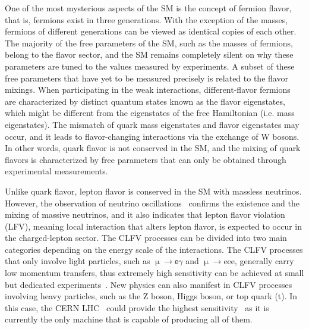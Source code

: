 One of the most mysterious aspects of the \ac{SM} is the concept of fermion flavor, that is, fermions exist in three generations. With the exception of the masses, fermions of different generations can be viewed as identical copies of each other. The majority of the free parameters of the \ac{SM}, such as the masses of fermions, belong to the flavor sector, and the \ac{SM} remains completely silent on why these parameters are tuned to the values measured by experiments. A subset of these free parameters that have yet to be measured precisely is related to the flavor mixings. When participating in the weak interactions, different-flavor fermions are characterized by distinct quantum states known as the flavor eigenstates, which might be different from the eigenstates of the free Hamiltonian (i.e. mass eigenstates). The mismatch of quark mass eigenstates and flavor eigenstates may occur, and it leads to flavor-changing interactions via the exchange of W bosons. In other words, quark flavor is not conserved in the \ac{SM}, and the mixing of quark flavors is characterized by free parameters that can only be obtained through experimental measurements. 

Unlike quark flavor, lepton flavor is conserved in the \ac{SM} with massless neutrinos. However, the observation of neutrino oscillations~\cite{Super-Kamiokande:1998kpq,SNO:2002tuh} confirms the existence and the mixing of massive neutrinos, and it also indicates that lepton flavor violation (LFV), meaning local interaction that alters lepton flavor, is expected to occur in the charged-lepton sector. The \ac{CLFV} processes can be divided into two main categories depending on the energy scale of the interactions. The \ac{CLFV} processes that only involve light particles, such as $\upmu\rightarrow\textsf{e}\gamma$ and $\upmu\rightarrow$eee, generally carry low momentum transfers, thus extremely high sensitivity can be achieved at small but dedicated experiments~\cite{MEGII:2018kmf,Mu3e:2020gyw}. New physics can also manifest in \ac{CLFV} processes involving heavy particles, such as the Z boson, Higgs boson, or top quark (t). In this case, the \ac{CERN} \ac{LHC}~\cite{Evans:2008zzb} could provide the highest sensitivity~\cite{Davidson:2012wn} as it is currently the only machine that is capable of producing all of them.

